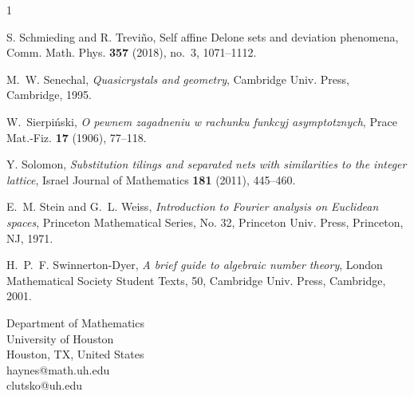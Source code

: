 \documentclass[reqno]{amsart}
\begin{document}
\begin{thebibliography}{1}
\vspace*{.1in}

S. Schmieding and R. Trevi\~no, Self affine Delone sets and deviation phenomena, Comm. Math. Phys. {\bf 357} (2018), no.~3, 1071--1112.

\vspace*{.1in}

M.~W. Senechal, {\it Quasicrystals and geometry}, Cambridge Univ. Press, Cambridge, 1995.

\vspace*{.1in}

W.~Sierpi\'{n}ski, {\em O pewnem zagadneniu w rachunku funkcyj asymptotznych}, Prace Mat.-Fiz. {\bf 17} (1906), 77--118.

\vspace*{.1in}

Y. Solomon, {\em Substitution tilings and separated nets with similarities to the integer lattice}, Israel Journal of Mathematics {\bf 181} (2011), 445--460.

\vspace*{.1in}

E.~M. Stein and G.~L. Weiss, {\it Introduction to Fourier analysis on Euclidean spaces}, Princeton Mathematical Series, No. 32, Princeton Univ. Press, Princeton, NJ, 1971.


\vspace*{.1in}

H.~P.~F. Swinnerton-Dyer, {\it A brief guide to algebraic number theory}, London Mathematical Society Student Texts, 50, Cambridge Univ. Press, Cambridge, 2001.

\end{thebibliography}
		
\vspace{.15in}
		
{\footnotesize
\noindent
Department of Mathematics\\
University of Houston\\
Houston, TX, United States\\
haynes@math.uh.edu\\
clutsko@uh.edu
			
}
		
		
	
\end{document}
